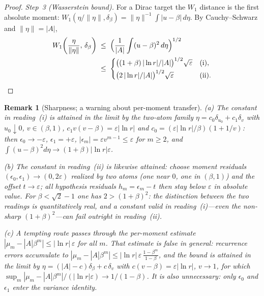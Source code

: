 \documentclass[pdflatex,sn-mathphys-num]{sn-jnl}
\theoremstyle{thmstyleone}
\theoremstyle{thmstyletwo}
\newtheorem*{remark}{Remark}
\theoremstyle{thmstylethree}
\begin{document}
\begin{proof}
\textit{Step~3 (Wasserstein bound).}  For a Dirac target the
$W_1$ distance is the first absolute moment:
$W_1(\eta/\|\eta\|, \delta_\beta) = \|\eta\|^{-1}\int|u-\beta|
\,d\eta$.  By Cauchy--Schwarz and $\|\eta\| = |A|$,
\[
\begin{aligned}
  W_1\!\left(\frac{\eta}{\|\eta\|},\,\delta_\beta\right)
  &\;\le\; \Bigl(\frac{1}{|A|}\int (u-\beta)^2\,d\eta\Bigr)^{1/2}\\
  &\;\le\;
  \begin{cases}
    \bigl((1+\beta)\,|\ln r|/|A|\bigr)^{1/2}\sqrt{\varepsilon}
      & \text{(i)},\\[2pt]
    \bigl(2\,|\ln r|/|A|\bigr)^{1/2}\sqrt{\varepsilon}
      & \text{(ii)}.
  \end{cases}
\end{aligned} \qedhere
\]
\end{proof}

\begin{remark}[Sharpness; a warning about per-moment transfer]
\textup{(a)} The constant in reading~(i) is attained in the limit by
the two-atom family $\eta = c_0\delta_{u_0} + c_1\delta_v$ with
$u_0 \downarrow 0$, $v \in (\beta,1)$, $c_1 v(v-\beta) =
\varepsilon|\ln r|$ and $c_0 = (\varepsilon|\ln r|/\beta)(1 + 1/v)$:
then $\epsilon_0 \to -\varepsilon$, $\epsilon_1 = +\varepsilon$,
$|\epsilon_m| = \varepsilon v^{m-1} \le \varepsilon$ for $m \ge 2$,
and $\int(u-\beta)^2 d\eta \to (1+\beta)|\ln r|\varepsilon$.

\textup{(b)} The constant in reading~(ii) is likewise attained:
choose moment residuals $(\epsilon_0, \epsilon_1) \to (0,
2\varepsilon)$ realized by two atoms (one near $0$, one in
$(\beta,1)$) and the offset $t \to \varepsilon$; all hypothesis
residuals $h_m = \epsilon_m - t$ then stay below $\varepsilon$ in
absolute value.  For $\beta < \sqrt2 - 1$ one has $2 >
(1+\beta)^2$: the distinction between the two readings is
quantitatively real, and a constant valid in reading~(i)---even the
non-sharp $(1+\beta)^2$---can \emph{fail} outright in reading~(ii).

\textup{(c)} A tempting route passes through the per-moment estimate
$|\mu_m - |A|\beta^m| \le |\ln r|\,\varepsilon$ for all $m$.  That
estimate is false in general: recurrence errors accumulate to
$|\mu_m - |A|\beta^m| \le |\ln r|\,\varepsilon\,
\tfrac{1-\beta^m}{1-\beta}$, and the bound is attained in the limit
by $\eta = (|A|-c)\delta_\beta + c\,\delta_v$ with $c(v-\beta) =
\varepsilon|\ln r|$, $v \to 1$, for which
$\sup_m |\mu_m - |A|\beta^m| / (|\ln r|\varepsilon) \to
1/(1-\beta)$.  It is also unnecessary: only $\epsilon_0$ and
$\epsilon_1$ enter the variance identity.
\end{remark}
\end{document}
